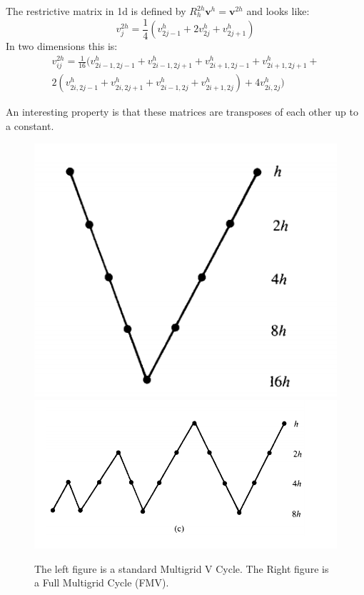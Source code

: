 \documentclass[pdftex,12pt,a4paper]{article}
\begin{document}
The restrictive matrix in 1d is defined by $R_h^{2h} \mathbf{v}^h = \mathbf{v}^{2h}$ and looks like:
$$
v_j^{2h} = \frac 1 4 \left( v_{2j-1}^h + 2v_{2j}^h + v_{2j+1}^h \right)
$$
In two dimensions this is: 
\begin{equation}
\begin{aligned}
v_{ij}^{2h} = \frac{1}{16} ( 
v_{2i-1, 2j-1}^h + v_{2i-1, 2j+1}^h  + v_{2i+1, 2j-1}^h  + v_{2i+1, 2j+1}^h  + \\ 2 \left( v_{2i, 2j-1}^h + v_{2i, 2j+1}^h + v_{2i-1,2j}^h + v_{2i+1,2j}^h\right) + 4v_{2i, 2j}^h  ) 
\end{aligned}
\end{equation}

An interesting property is that these matrices are transposes of each other up to a constant. 

    \begin{figure}[h]
    \centering
    \includegraphics[scale=0.4]{../plots/vcycle.png}
    \includegraphics[scale=0.4]{../plots/full-multi-grid-cycle.png}
    \caption{The left figure is a standard Multigrid V Cycle.  The Right figure is a Full Multigrid Cycle (FMV). }
    \end{figure}
\end{document}
